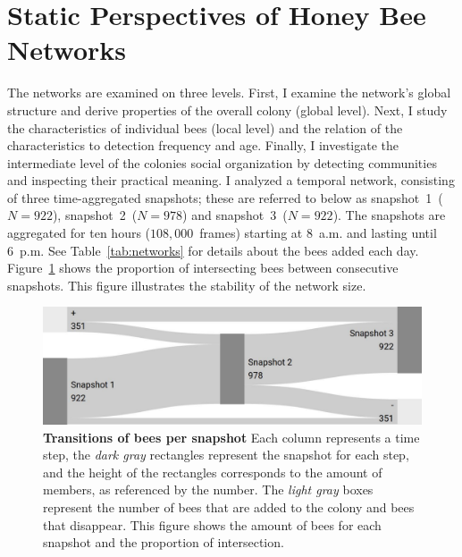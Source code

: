 \section{Static Perspectives of Honey Bee Networks}
The networks are examined on three levels.
First, I examine the network's global structure and derive properties of the overall colony (global level).
Next, I study the characteristics of individual bees (local level) and the relation of the characteristics to detection frequency and age.
Finally, I investigate the intermediate level of the colonies social organization by detecting communities and inspecting their practical meaning.
I analyzed a temporal network, consisting of three time-aggregated snapshots; these are referred to below as snapshot~1~($N = 922$), snapshot~2~($N = 978$) and snapshot~3~($N = 922$).
The snapshots are aggregated for ten hours ($108,000$~frames) starting at 8~a.m. and lasting until 6~p.m.
See Table~\ref{tab:networks} for details about the bees added each day. Figure~\ref{fig:network-matching} shows the proportion of intersecting bees between consecutive snapshots.
This figure illustrates the stability of the network size.




\begin{figure}[htb]
	\centering
	\includegraphics[width=1.0\textwidth]{Figures/network_matching}
	\caption[Transitions of bees per snapshot]{
	\textbf{Transitions of bees per snapshot}
	Each column represents a time step, the \emph{dark gray} rectangles represent the snapshot for each step, and the height of the rectangles corresponds to the amount of members, as referenced by the number.
	The \emph{light gray} boxes represent the number of bees that are added to the colony and bees that disappear.
	This figure shows the amount of bees for each snapshot and the proportion of intersection.}
	\label{fig:network-matching}
\end{figure}





